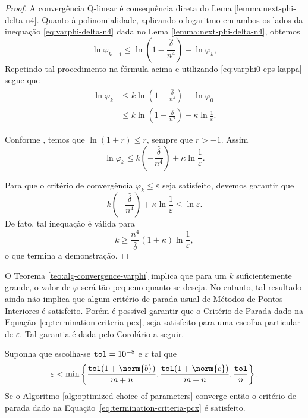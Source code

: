 \begin{proof} A convergência Q-linear é consequência direta do Lema \ref{lemma:next-phi-delta-n4}. Quanto à polinomialidade, aplicando o logaritmo em ambos os lados da inequação \eqref{eq:varphi-delta-n4} dada no Lema \ref{lemma:next-phi-delta-n4}, obtemos
	\[
	\ln\varphi_{k+1}\leq \ln \left(1 - \frac{\hat{\delta}}{n^{4}}\right) + \ln\varphi_{k},
	\]
Repetindo tal procedimento na fórmula acima e utilizando \eqref{eq:varphi0-eps-kappa} segue que
\[
	\begin{aligned}
		\ln\varphi_{k} & \leq k \ln\left(1 - \frac{\hat{\delta}}{n^{4}}\right) + \ln \varphi_{0} \\
					& \leq k \ln\left(1 - \frac{\hat{\delta}}{n^{4}}\right) + \kappa\ln \frac{1}{\varepsilon}. 
	\end{aligned}
\] 

Conforme \textcite[Lema 4.1, pg 68]{Wright:Primal-dual-interior-point:1997h}, temos que $\ln(1+r) \leq r$, sempre que $r>-1$. Assim
\[
	\ln\varphi_{k}\leq k \left(- \frac{\hat{\delta}}{n^{4}}\right) + \kappa\ln \frac{1}{\varepsilon}.
\] 

Para que o critério de convergência $\varphi_{k}\leq\varepsilon$ seja satisfeito, devemos garantir que 
\[
	k \left(- \frac{\hat{\delta}}{n^{4}}\right) + \kappa\ln \frac{1}{\varepsilon} \leq \ln\varepsilon.
\] 
De fato, tal inequação é válida para 
\[
	k \geq \dfrac{n^{4}}{\hat{\delta}}(1+\kappa)\ln\frac{1}{\varepsilon},
\]
o que termina a demonstração.
\end{proof}




O Teorema \ref{teo:alg-convergence-varphi} implica que para um $k$ suficientemente grande, o valor de $\varphi$ será tão pequeno quanto se deseja. No entanto, tal resultado ainda não implica que algum critério de parada usual de Métodos de Pontos Interiores é satisfeito. Porém é possível garantir que o Critério de Parada dado na Equação~\eqref{eq:termination-criteria-pcx}, seja satisfeito para uma escolha particular de $\varepsilon$. Tal garantia é dada pelo Corolário a seguir.

\begin{corol}
Suponha que escolha-se  $\mathtt{tol} = 10^{-8}$  e $\varepsilon$   tal que 
\begin{equation}
	\label{eq:choosing-eps}
		\varepsilon < \min\left\{  \frac{\tol(1+\norm{b})}{m+n}, \frac{\tol(1+\norm{c})}{m+n},\frac{\tol}{n}\right\}.
\end{equation}
Se o Algoritmo \ref{alg:optimized-choice-of-parameters} converge então o critério de parada dado na Equação~\eqref{eq:termination-criteria-pcx} é satisfeito.
\end{corol}		

